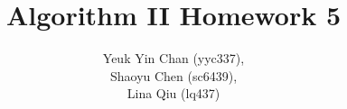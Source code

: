 \documentclass[12pt]{article}
\begin{document}
 
 
\title{Algorithm II Homework 5}
\author{Yeuk Yin Chan (yyc337),\\
Shaoyu Chen (sc6439),\\
Lina Qiu (lq437)}

\maketitle






 
\end{document}
